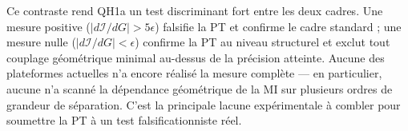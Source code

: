 Ce contraste rend QH1a un test discriminant fort entre les deux
cadres. Une mesure positive ($|d\mathcal{I}/dG| > 5\epsilon$)
falsifie la PT et confirme le cadre standard ; une mesure nulle
($|d\mathcal{I}/dG| < \epsilon$) confirme la PT au niveau
structurel et exclut tout couplage géométrique minimal au-dessus
de la précision atteinte. Aucune des plateformes actuelles n'a
encore réalisé la mesure complète --- en particulier, aucune
n'a scanné la dépendance géométrique de la MI sur plusieurs ordres
de grandeur de séparation. C'est la principale lacune
expérimentale à combler pour soumettre la PT à un test
falsificationniste réel.
